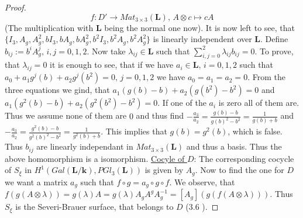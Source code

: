 \documentclass[12pt, oneside, reqno]{amsart}
\begin{document}
\begin{proof}
     \[f: D' \rightarrow Mat_{3 \times 3}(\textbf{L}), \, A \otimes c \mapsto cA\]
     (The multiplication with $\textbf{L}$ being the normal one now). It is now left to see, that \newline 
     $\{ I_3, A_g, A_g^2, bI_3, bA_g, bA_g^2,b^2I_3,b^2A_g,b^2A_g^2\}$ is linearly independent over $\textbf{L}$. Define $b_{ij}:= b^i A_g^j, \, i,j=0,1,2$.  Now take $\lambda_{ij} \in \textbf{L}$ such that $\sum_{i,j=0}^2 \lambda_{ij}b_{ij} = 0$. To prove, that $\lambda_{ij} = 0$ it is enough to see, that if we have $a_i \in \textbf{L}, \, i=0,1,2$ such that $a_0 + a_1g^j(b) + a_2g^j(b^2) = 0, \, j=0,1,2$ we have $a_0=a_1=a_2=0$. From the three equations we gind, that $a_1(g(b)-b) + a_2(g(b^2)-b^2)= 0$ and $a_1(g^2(b)- b) + a_2(g^2(b^2) - b^2) = 0$. If one of the $a_i$ is zero all of them are. Thus we assume none of them are $0$ and thus find $- \frac{a_3}{a_2} = \frac{g(b) - b}{g(b)^2 - b^2} = \frac{1}{g(b) + b}$ and $- \frac{a_3}{a_2} = \frac{g^2(b) - b}{g^2(b)^2 - b ^2} = \frac{1}{g^2(b) + b}$. This implies that $g(b) = g^2(b)$, which is false. Thus $b_{ij}$ are linearly independant in $Mat_{3 \times 3}(\textbf{L})$ and thus a basis. Thus the above homomorphism is a isomorphism.
     \newline
     \underline{Cocyle of $D$}: The corresponding cocycle of $S_{\xi}$ in $H^1(Gal(\textbf{L}/\textbf{k}), PGl_3(\textbf{L}))$ is given by $A_g$. Now to find the one for $D$ we want a matrix $a_g$ such that $f \circ g = a_g \circ g \circ f$. We observe, that $f(g(A \otimes \lambda)) = g(\lambda) A = g(\lambda) A_g A^g A_g^{-1} = [A_g] (g (f (A \otimes \lambda))) $. Thus $S_{\xi}$ is the Severi-Brauer surface, that belongs to $D$ (3.6 \cite{jahnel}).
\end{proof}
\end{document}
